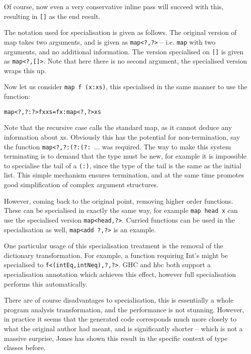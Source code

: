 \documentclass[preprint]{sigplanconf}
\newcommand{\T}[1]{\texttt{#1}}
\newenvironment{code}{\begin{alltt}\small}{\end{alltt}}
\begin{document}
Of course, now even a very conservative inline pass will succeed with this,
resulting in \T{[]} as the end result.

The notation used for specialisation is given as follows. The original version
of map takes two arguments, and is given as \T{map<?,?>} -- i.e. \T{map} with
two arguments, and no additional information. The version specialised on \T{[]}
is given as \T{map<?,[]>}. Note that here there is no second argument, the
specialised version wraps this up.

Now let us consider \T{map f (x:xs)}, this specialised in the same manner to
use the function:

\begin{code}
 map<?,?:?> f x xs = f x : map<?,?> xs
\end{code}

Note that the recursive case calls the standard map, as it cannot deduce any
information about xs. Obviously this has the potential for non-termination, say
the function \T{map<?,?:(?:(?: $\ldots$} was required. The way to make this
system terminating is to demand that the type must be new, for example it is
impossible to specialise the tail of a \T{(:)}, since the type of the tail is
the same as the initial list. This simple mechanism ensures termination, and at
the same time promotes good simplification of complex argument structures.

However, coming back to the original point, removing higher order functions.
These can be specialised in exactly the same way, for example \T{map head x}
can use the specialised version \T{map<head,?>}. Curried functions can be used
in the specialisation as well, \T{map<add ?,?>} is an example.

One particular usage of this specialisation treatment is the removal of the
dictionary transformation. For example, a function requiring Int's might be
specialised to \T{f<(intEq,intNeq),?,?>}. GHC and hbc both support a
specialisation annotation which achieves this effect, however full
specialisation performs this automatically.

There are of course disadvantages to specialisation, this is essentially a
whole program analysis transformation, and the performance is not stunning.
However, in practice it seems that the generated code corresponds much more
closely to what the original author had meant, and is significantly shorter --
which is not a massive surprise, Jones has shown this result in the specific
context of type classes before.
\end{document}
